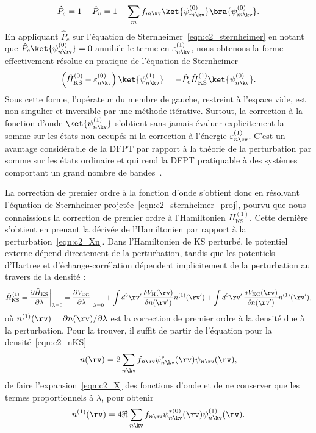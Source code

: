 \begin{equation}
    \hat{P}_c = 1-\hat{P}_v = 1-\sum_{m}f_{m\kv}\ket{\psi_{m\kv}^{(0)}}\bra{\psi_{m\kv}^{(0)}}.
\end{equation}
En appliquant $\hat{P}_c$ sur l'équation de Sternheimer~\eqref{eqn:c2_sternheimer} en notant que $\hat{P}_c\ket{\psi_{n\kv}^{(0)}}=0$ annihile le terme en $\varepsilon_{n\kv}^{(1)}$, nous obtenons la forme effectivement résolue en pratique de l'équation de Sternheimer
\begin{equation}
    \left(\hat{H}^{(0)}_\text{KS}-\varepsilon_{n\kv}^{(0)}\right)\ket{\psi_{n\kv}^{(1)}}=- \hat{P}_c \hat{H}_{\text{KS}}^{(1)}\ket{\psi_{n\kv}^{(0)}}.
    \label{eqn:c2_sternheimer_proj}
\end{equation} 
Sous cette forme, l'opérateur du membre de gauche, restreint à l'espace vide, est non-singulier et inversible par une méthode itérative. Surtout, la correction à la fonction d'onde $\ket{\psi_{n\kv}^{(1)}}$ s'obtient sans jamais évaluer explicitement la somme sur les états non-occupés ni la correction à l'énergie $\varepsilon_{n\kv}^{(1)}$. C'est un avantage considérable de la DFPT par rapport à la théorie de la perturbation par somme sur les états ordinaire et qui rend la DFPT pratiquable à des systèmes comportant un grand nombre de bandes~\cite{baroniPhononsRelatedCrystal2001a}. 

La correction de premier ordre à la fonction d'onde s'obtient donc en résolvant l'équation de Sternheimer projetée~\eqref{eqn:c2_sternheimer_proj}, pourvu que nous connaissions la correction de premier ordre à l'Hamiltonien $H_\text{KS}^{(1)}$. Cette dernière s'obtient en prenant la dérivée de l'Hamiltonien par rapport à la perturbation~\eqref{eqn:c2_Xn}. Dans l'Hamiltonien de KS perturbé, le potentiel externe dépend directement de la perturbation, tandis que les potentiels d'Hartree et d'échange-corrélation dépendent implicitement de la perturbation au travers de la densité :
\begin{equation}
    \hat{H}_\text{KS}^{(1)}=\frac{\partial \hat{H}_\text{KS}}{\partial \lambda}\bigg\rvert_{\lambda=0}=\frac{\partial V_\text{ext}}{\partial\lambda}\bigg\rvert_{\lambda=0}+\int d^3\rv'\,\frac{\delta V_\text{H}(\rv)}{\delta n(\rv')}n^{(1)}(\rv')+\int d^3\rv'\,\frac{\delta V_\text{XC}(\rv)}{\delta n(\rv')}n^{(1)}(\rv'),
    \label{eqn:c2_H1}
\end{equation} 
où $n^{(1)}(\rv)=\partial n(\rv)/\partial \lambda$ est la correction de premier ordre à la densité due à la perturbation. Pour la trouver, il suffit de partir de l'équation pour la densité~\eqref{eqn:c2_nKS}
\begin{equation}
    n(\rv)=2\sum_{n\kv}f_{n\kv}\psi^*_{n\kv}(\rv)\psi_{n\kv}(\rv),
\end{equation}
de faire l'expansion~\eqref{eqn:c2_X} des fonctions d'onde et de ne conserver que les termes proportionnels à $\lambda$, pour obtenir
\begin{equation}
    n^{(1)}(\rv)=4\Re\sum_{n\kv}f_{n\kv}\psi_{n\kv}^{*{(0)}}(\rv)\psi_{n\kv}^{(1)}(\rv).
    \label{eqn:c2_n1}
\end{equation}

